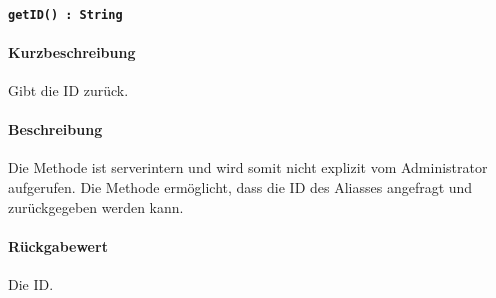 \paragraph{\texttt{getID() : String}}%
\paragraph*{Kurzbeschreibung}
Gibt die ID zurück.
\paragraph*{Beschreibung}
Die Methode ist serverintern und wird somit nicht explizit vom Administrator aufgerufen.
Die Methode ermöglicht, dass die ID des Aliasses angefragt und zurückgegeben werden kann.
\paragraph*{Rückgabewert}
Die ID.
